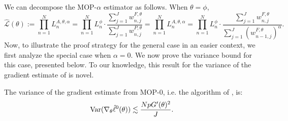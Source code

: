 We can decompose the MOP-$\alpha$ estimator as follows. 
When $\theta=\phi$,
\begin{equation}
\hat{\mathcal{L}}(\theta):=\prod_{n=1}^N L_n^{A, \theta, \alpha}=\prod_{n=1}^N L_n^\phi \cdot \frac{\sum_{j=1}^J w_{n, j}^{F, \theta}}{\sum_{j=1}^J w_{n, j}^{P, \theta}}=\prod_{n=1}^N L_n^{A, \theta, \alpha}=\prod_{n=1}^N L_n^\phi \cdot \frac{\sum_{j=1}^J w_{n, j}^{F, \theta}}{\sum_{j=1}^J (w_{n-1, j}^{F, \theta})^\alpha}.
\end{equation}
Now, to illustrate the proof strategy for the general case in an easier context, we first analyze the special case when $\alpha=0.$ We now prove the variance bound for this case, presented below. To our knowledge, this result for the variance of the gradient estimate of \cite{naesseth18} is novel. 

\begin{thm}
The variance of the gradient estimate from MOP-$0$, i.e. the algorithm of \cite{naesseth18}, is:
 \begin{equation}
     \mathrm{Var}(\nabla_\theta \hat\ell^0(\theta)) \lesssim \frac{NpG'(\theta)^2}{J}.
 \end{equation}
\end{thm}

